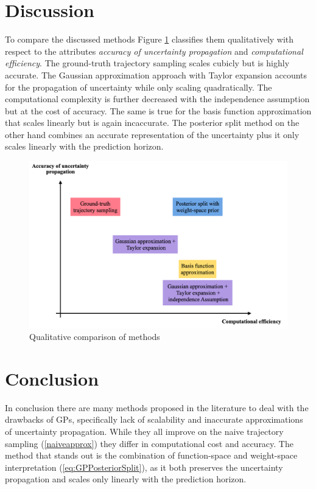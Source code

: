 \section{Discussion}
To compare the discussed methods Figure \ref{f:Comparison} classifies them qualitatively with respect to the attributes \textit{accuracy of uncertainty propagation} and \textit{computational efficiency}. The ground-truth trajectory sampling scales cubicly but is highly accurate. The Gaussian approximation approach with Taylor expansion accounts for the propagation of uncertainty while only scaling quadratically. The computational complexity is further decreased with the independence assumption but at the cost of accuracy. The same is true for the basis function approximation that scales linearly but is again incaccurate. The posterior split method on the other hand combines an accurate representation of the uncertainty plus it only scales linearly with the prediction horizon.
\begin{figure}[ht]
        \centering
        \includegraphics[width=1.1\linewidth]{SoM_report_template/figures/Bildschirmfoto 2020-12-18 um 12.50.51.png}
        \caption[Qualitative comparison of methods]{\label{f:Comparison} Qualitative comparison of methods }
\end{figure}

\section{Conclusion}
In conclusion there are many methods proposed in the literature to deal with the drawbacks of GPs, specifically lack of scalability and inaccurate approximations of uncertainty propagation. While they all improve on the naive trajectory sampling (\ref{naiveapprox}) they differ in computational cost and accuracy. The method that stands out is the combination of function-space and weight-space interpretation (\ref{eq:GPPosteriorSplit}), as it both preserves the uncertainty propagation and scales only linearly with the prediction horizon. 